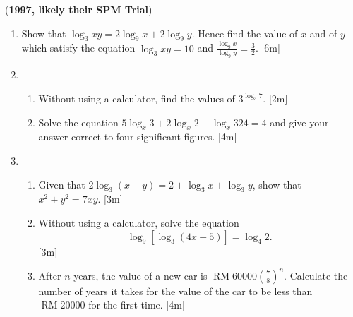 \documentclass[notoc,notitlepage]{tufte-book}
\DeclareMathOperator{\RM}{RM}
\begin{document}
(\textbf{1997, likely their SPM Trial})
\begin{enumerate}
  \item Show that $\log_{3} xy = 2 \log_{9} x + 2 \log_{9} y$. Hence find
    the value of $x$ and of $y$ which satisfy the equation $\log_{3} xy =
    10$ and $\frac{\log_9 x}{\log_9 y} = \frac{3}{2}$. [6m]


  \item
    \begin{enumerate}
      \item Without using a calculator, find the values of $3^{\log_3 7}$. [2m]
      \item Solve the equation $5 \log_x 3 + 2 \log_x 2 - \log_x 324 = 4$ and
        give your answer correct to four significant figures. [4m]
    \end{enumerate}

  \item
    \begin{enumerate}
      \item Given that $2 \log_3 (x + y) = 2 + \log_3 x + \log_3 y$, show that
        $x^2 + y^2 = 7xy$. [3m]
      \item Without using a calculator, solve the equation
        \begin{equation*}
          \log_9 [ \log_3 (4x - 5) ] = \log_4 2.
        \end{equation*}
        [3m]
      \item After $n$ years, the value of a new car is $\RM 60 000 \left(
        \frac{7}{8} \right)^n$.  Calculate the number of years it takes for the
        value of the car to be less than $\RM 20000$ for the first time. [4m]
    \end{enumerate}
\end{enumerate}
\end{document}
